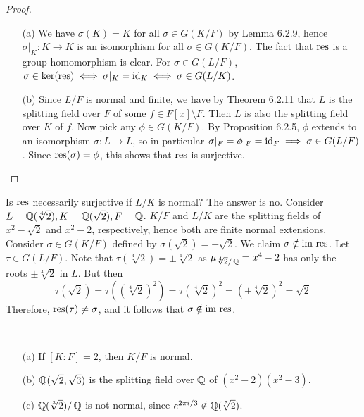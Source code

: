 \documentclass[11pt]{book}
\theoremstyle{definition}   \newtheorem{defn}[counter]{Definition} %
\newcommand{\bs}{\setminus}   \newcommand{\A}{\mathcal{A}}   \newcommand{\sy}{\textnormal{Syl}}   \newcommand{\size}[1]{\left| #1 \right|}
\DeclareMathOperator{\ra}{\rightarrow}   \DeclareMathOperator{\Poly}{\mathbf{P}}   \DeclareMathOperator{\spn}{\textnormal{span}}   \DeclareMathOperator{\aut}{\textnormal{Aut}}
\newcommand{\vs}{\vspace{8pt}}
\numberwithin{counter}{chapter}
\begin{document}
\begin{proof}\ 
\begin{enumerate}
\item[(a)] We have $\sigma(K) = K$ for all $\sigma \in G(K/F)$ by Lemma 6.2.9, hence $\sigma|_K : K \ra K$ is an isomorphism for all $\sigma \in G(K/F)$. The fact that $\textnormal{res}$ is a group homomorphism is clear. For $\sigma \in G(L/F)$, $\sigma \in \ker(\textnormal{res}) \iff \sigma|_K = \textnormal{id}_K \iff \sigma \in G(L/K)$.  

\item[(b)] Since $L/F$ is normal and finite, we have by Theorem 6.2.11 that $L$ is the splitting field over $F$ of some $f \in F[x] \bs F$. Then $L$ is also the splitting field over $K$ of $f$. Now pick any $\phi \in G(K/F)$. By Proposition 6.2.5, $\phi$ extends to an isomorphism $\sigma : L \ra L$, so in particular $\sigma|_F = \phi|_F = \textnormal{id}_F \implies \sigma \in G(L/F)$. Since $\textnormal{res}(\sigma) = \phi$, this shows that $\textnormal{res}$ is surjective. 
\end{enumerate}
\end{proof}

\vs

\begin{remark*}
Is $\textnormal{res}$ necessarily surjective if $L/K$ is normal? The answer is no. Consider $L = \operatorname{\mathbb{Q}}(\sqrt[4]{2}), K = \operatorname{\mathbb{Q}}(\sqrt{2}), F = \operatorname{\mathbb{Q}}$. $K/F$ and $L/K$ are the splitting fields of $x^2-\sqrt{2}$ and $x^2-2$, respectively, hence both are finite normal extensions. Consider $\sigma \in G(K/F)$ defined by $\sigma(\sqrt{2}) = -\sqrt{2}$. We claim $\sigma \notin \textnormal{im } \textnormal{res}$. Let $\tau \in G(L/F)$. Note that $\tau(\sqrt[4]{2}) = \pm \sqrt[4]{2}$ as $\mu_{\sqrt[4]{2}/\operatorname{\mathbb{Q}}} = x^4-2$ has only the roots $\pm \sqrt[4]{2}$ in $L$. But then
	\[\tau(\sqrt{2}) = \tau((\sqrt[4]{2})^2) = \tau(\sqrt[4]{2})^2 = (\pm \sqrt[4]{2})^2 = \sqrt{2} \]
Therefore, $\textnormal{res}(\tau) \ne \sigma$, and it follows that $\sigma \notin \textnormal{im } \textnormal{res}$. 
\end{remark*}

\vs

\begin{example}\ 
\begin{enumerate}
\item[(a)] If $[K : F] = 2$, then $K/F$ is normal. 
\item[(b)] $\operatorname{\mathbb{Q}}(\sqrt{2},\sqrt{3})$ is the splitting field over $\operatorname{\mathbb{Q}}$ of $(x^2-2)(x^2-3)$. 
\item[(c)] $\operatorname{\mathbb{Q}}(\sqrt[3]{2})/\operatorname{\mathbb{Q}}$ is not normal, since $e^{2 \pi i/3} \notin \operatorname{\mathbb{Q}}(\sqrt[3]{2})$. 
\end{enumerate}
\end{example}
\end{document}
